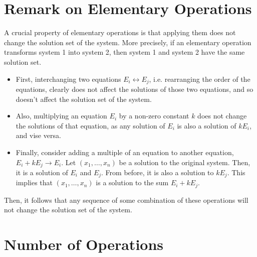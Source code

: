 \documentclass[letterpaper,12pt]{article}
\begin{document}
\section*{Remark on Elementary Operations}
A crucial property of elementary operations is that applying them does not change the solution set of the system. More precisely, if an elementary operation transforms system 1 into system 2, then system 1 and system 2 have the same solution set.
\begin{itemize}
    \item First, interchanging two equations $E_i \leftrightarrow E_j$, i.e. rearranging the order of the equations, clearly does not affect the solutions of those two equations, and so doesn't affect the solution set of the system.
    \item Also, multiplying an equation $E_i$ by a non-zero constant $k$ does not change the solutions of that equation, as any solution of $E_i$ is also a solution of $kE_i$, and vise versa.
    \item Finally, consider adding a multiple of an equation to another equation, $E_i + kE_j \rightarrow E_i$. Let $(x_1, \dots, x_n)$ be a solution to the original system. Then, it is a solution of $E_i$ and $E_j$. From before, it is also a solution to $kE_j$. This implies that $(x_1, \dots, x_n)$ is a solution to the sum $E_i + kE_j$.
\end{itemize}
Then, it follows that any sequence of some combination of these operations will not change the solution set of the system.

\section*{Number of Operations}
\end{document}
